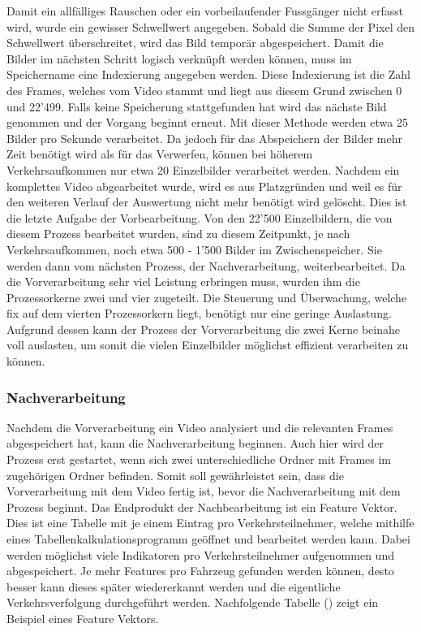 Damit ein allfälliges Rauschen oder ein vorbeilaufender Fussgänger nicht erfasst wird, wurde ein gewisser Schwellwert angegeben. Sobald die Summe der Pixel den Schwellwert überschreitet, wird das Bild temporär abgespeichert. Damit die Bilder im nächsten Schritt logisch verknüpft werden können, muss im Speichername eine Indexierung angegeben werden. Diese Indexierung ist die Zahl des Frames, welches vom Video stammt und liegt aus diesem Grund zwischen 0 und 22'499. Falls keine Speicherung stattgefunden hat wird das nächste Bild genommen und der Vorgang beginnt erneut. Mit dieser Methode werden etwa 25 Bilder pro Sekunde verarbeitet. Da jedoch für das Abspeichern der Bilder mehr Zeit benötigt wird als für das Verwerfen, können bei höherem Verkehrsaufkommen nur etwa 20 Einzelbilder verarbeitet werden. Nachdem ein komplettes Video abgearbeitet wurde, wird es aus Platzgründen und weil es für den weiteren Verlauf der Auswertung nicht mehr benötigt wird gelöscht. Dies ist die letzte Aufgabe der Vorbearbeitung. Von den 22'500 Einzelbildern, die von diesem Prozess bearbeitet wurden, sind zu diesem Zeitpunkt, je nach Verkehrsaufkommen, noch etwa 500 - 1'500 Bilder im Zwischenspeicher. Sie werden dann vom nächsten Prozess, der Nachverarbeitung, weiterbearbeitet. Da die Vorverarbeitung sehr viel Leistung erbringen muss, wurden ihm die Prozessorkerne zwei und vier zugeteilt. Die Steuerung und Überwachung, welche fix auf dem vierten Prozessorkern liegt, benötigt nur eine geringe Auslastung. Aufgrund dessen kann der Prozess der Vorverarbeitung die zwei Kerne beinahe voll auslasten, um somit die vielen Einzelbilder möglichst effizient verarbeiten zu können.

\subsubsection{Nachverarbeitung}
Nachdem die Vorverarbeitung ein Video analysiert und die relevanten Frames abgespeichert hat, kann die Nachverarbeitung beginnen. Auch hier wird der Prozess erst gestartet, wenn sich zwei unterschiedliche Ordner mit Frames im zugehörigen Ordner befinden. Somit soll gewährleistet sein, dass die Vorverarbeitung mit dem Video fertig ist, bevor die Nachverarbeitung mit dem Prozess beginnt. Das Endprodukt der Nachbearbeitung ist ein Feature Vektor. Dies ist eine Tabelle mit je einem Eintrag pro Verkehrsteilnehmer, welche mithilfe eines Tabellenkalkulationsprogramm geöffnet und bearbeitet werden kann. Dabei werden möglichst viele Indikatoren pro Verkehrsteilnehmer aufgenommen und abgespeichert. Je mehr Features pro Fahrzeug gefunden werden können, desto besser kann dieses später wiedererkannt werden und die eigentliche Verkehrsverfolgung durchgeführt werden. Nachfolgende Tabelle () zeigt ein Beispiel eines Feature Vektors.

